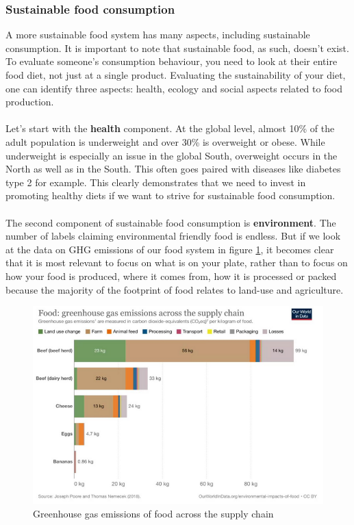 \documentclass[../summary.tex]{subfiles}
\begin{document}
	\newpage
	\subsubsection{Sustainable food consumption}
	
	A more sustainable food system has many aspects, including sustainable consumption. It is important to note that sustainable food, as such, doesn’t exist. To evaluate someone’s consumption behaviour, you need to look at their entire food diet, not just at a single product. Evaluating the sustainability of your diet, one can identify three aspects: health, ecology and social aspects related to food production.
	\\\\
	Let’s start with the \textbf{health} component. At the global level, almost 10\% of the adult population is underweight and over 30\% is overweight or obese. While underweight is especially an issue in the global South, overweight occurs in the North as well as in the South. This often goes paired with diseases like diabetes type 2 for example. This clearly demonstrates that we need to invest in promoting healthy diets if we want to strive for sustainable food consumption.
	\\\\
	The second component of sustainable food consumption is \textbf{environment}. The number of labels claiming environmental friendly food is endless. But if we look at the data on GHG emissions of our food system in figure \ref{fig:greenhouse-gas}, it becomes clear that it is most relevant to focus on what is on your plate, rather than to focus on how your food is produced, where it comes from, how it is processed or packed because the majority of the footprint of food relates to land-use and agriculture. 
	
	\begin{figure} [htbp]
		\centering
		\includegraphics[width=1\linewidth]{images/6-greenhouse-gas.png}
		\caption{Greenhouse gas emissions of food across the supply chain}
		\label{fig:greenhouse-gas}
	\end{figure}
	
\end{document}
